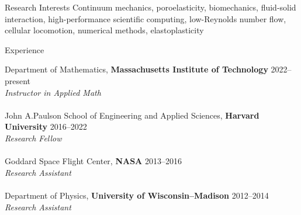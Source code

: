 \documentclass{cv}
\begin{document}
\begin{rSection}{Research Interests}
Continuum mechanics, poroelasticity, biomechanics, fluid-solid interaction, high-performance scientific computing, low-Reynolds number flow, cellular locomotion, numerical methods, elastoplasticity
\end{rSection}

\begin{rSection}{Experience}

Department of Mathematics, {\bf Massachusetts Institute of Technology} \hfill {2022--present}\\
	\mbox{}\hspace{2em}\textit{Instructor in Applied Math}\\
\\John A.\@ Paulson School of Engineering and Applied Sciences, {\bf Harvard University} \hfill {2016--2022}\\
	\mbox{}\hspace{2em}\textit{Research Fellow}\\
\\Goddard Space Flight Center, {\bf NASA} \hfill {2013--2016}\\
	\mbox{}\hspace{2em}\textit{Research Assistant}\\
\\Department of Physics, {\bf University of Wisconsin--Madison} \hfill {2012--2014}\\
	\mbox{}\hspace{2em}\textit{Research Assistant}
\end{rSection}
\end{document}
